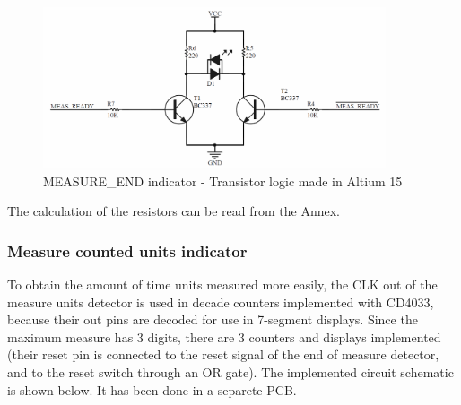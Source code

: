 \begin{figure}[H]
    \begin{centering}
    \includegraphics[width=0.9\textwidth]{data/Transistor_LogicLED}
    \par\end{centering}
    \caption{MEASURE\_END indicator - Transistor logic made in Altium 15}
\end{figure}
The calculation of the resistors can be read from the Annex.

\subsubsection*{Measure counted units indicator}

To obtain the amount of time units measured more easily, the CLK out of the
measure units detector is used in decade counters implemented with CD4033, because 
their out pins are decoded for use in 7-segment displays. Since the maximum measure 
has 3 digits, there are 3 counters and displays implemented (their reset pin is 
connected to the reset signal of the end of measure detector, and to the reset switch 
through an OR gate). The implemented circuit schematic is shown below. It has been done in 
a separete PCB.

